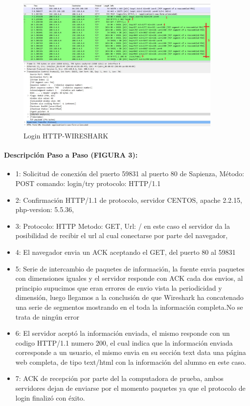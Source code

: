 \documentclass[letterpaper]{article}
\begin{document}
\newpage

\begin{figure}[h]
	\centering
	\includegraphics[width=0.9\textwidth]{img/http-login-2.jpg}
	\caption{Login HTTP-WIRESHARK}
	\label{figura 3}
\end{figure}

\paragraph{Descripción Paso a Paso (FIGURA 3):}

	\begin{itemize}
				
		\item{1: Solicitud de conexión del puerto 59831 al puerto 80 de Sapienza, Método: POST comando: login/try protocolo: HTTP/1.1  }

		\item{2: Confirmación HTTP/1.1 de protocolo, servidor CENTOS, apache 2.2.15, php-version: 5.5.36, }
		\item{3: Protocolo: HTTP Metodo: GET, Url: / en este caso el servidor da la posibilidad de recibir el url al cual conectarse por parte del navegador, }
		\item{4: El navegador envia un ACK aceptando el GET, del puerto 80 al 59831}
		\item{5: Serie de intercambio de paquetes de información, la fuente envia paquetes con dimensiones iguales y el servidor responde con ACK cada dos envios, al principio supucimos que eran errores de envio vista la periodicidad y dimensión, luego llegamos a la conclusión de que Wireshark ha concatenado una serie de segmentos mostrando en el toda la información completa.No se trata de ningún error}
		\item{6: El servidor aceptó la información enviada, el mismo responde con un codigo HTTP/1.1 numero 200, el cual indica que la información enviada corresponde a un usuario, el mismo envia en su sección text data una página web completa, de tipo text/html con la información del alumno en este caso.}
		\item{7: ACK de recepción por parte del la computadora de prueba, ambos servidores dejan de enviarse por el momento paquetes ya que el protocolo de login finalizó con éxito. }
	\end{itemize}
\end{document}
